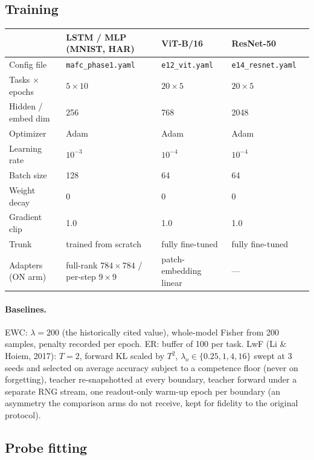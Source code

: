\subsection{Training}

\begin{center}\small
\begin{tabular}{@{}lllll@{}}
\toprule
 & LSTM / MLP (MNIST, HAR) & ViT-B/16 & ResNet-50 \\
\midrule
Config file & \texttt{mafc\_phase1.yaml} & \texttt{e12\_vit.yaml} & \texttt{e14\_resnet.yaml} \\
Tasks $\times$ epochs & $5 \times 10$ & $20 \times 5$ & $20 \times 5$ \\
Hidden / embed dim & 256 & 768 & 2048 \\
Optimizer & Adam & Adam & Adam \\
Learning rate & $10^{-3}$ & $10^{-4}$ & $10^{-4}$ \\
Batch size & 128 & 64 & 64 \\
Weight decay & 0 & 0 & 0 \\
Gradient clip & 1.0 & 1.0 & 1.0 \\
Trunk & trained from scratch & fully fine-tuned & fully fine-tuned \\
Adapters (ON arm) & full-rank $784\times784$ / per-step $9\times9$ & patch-embedding linear & --- \\
\bottomrule
\end{tabular}
\end{center}


\paragraph{Baselines.} EWC: $\lambda{=}200$ (the historically cited value),
whole-model Fisher from 200 samples, penalty recorded per epoch. ER: buffer of
100 per task. LwF (Li \& Hoiem, 2017): $T{=}2$, forward KL scaled by $T^2$,
$\lambda_o \in \{0.25, 1, 4, 16\}$ swept at 3 seeds and selected on average
accuracy subject to a competence floor (never on forgetting), teacher
re-snapshotted at every boundary, teacher forward under a separate RNG stream,
one readout-only warm-up epoch per boundary (an asymmetry the comparison arms do
not receive, kept for fidelity to the original protocol).

\subsection{Probe fitting}
\label{app:probe}

